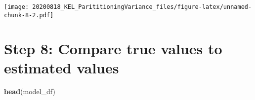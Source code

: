 \documentclass[]{article}
\newenvironment{Shaded}{\begin{snugshade}}{\end{snugshade}}
\newcommand{\CommentTok}[1]{\textcolor[rgb]{0.56,0.35,0.01}{\textit{#1}}}
\newcommand{\KeywordTok}[1]{\textcolor[rgb]{0.13,0.29,0.53}{\textbf{#1}}}
\newcommand{\NormalTok}[1]{#1}
\newcommand{\OperatorTok}[1]{\textcolor[rgb]{0.81,0.36,0.00}{\textbf{#1}}}
\newcommand{\StringTok}[1]{\textcolor[rgb]{0.31,0.60,0.02}{#1}}
\begin{document}
\texttt{[image: 20200818\_KEL\_ParititioningVariance\_files/figure-latex/unnamed-chunk-8-2.pdf]}

\begin{Shaded}
\end{Shaded}

\hypertarget{step-8-compare-true-values-to-estimated-values}{%
\section{Step 8: Compare true values to estimated
values}\label{step-8-compare-true-values-to-estimated-values}}

\begin{Shaded}
\begin{Highlighting}[]
\KeywordTok{head}\NormalTok{(model_df)}
\end{Highlighting}
\end{Shaded}
\end{document}
